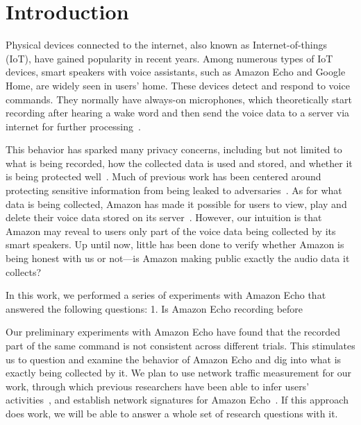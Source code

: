 \section{Introduction}
Physical devices connected to the internet, also known as Internet-of-things (IoT), have gained popularity in recent years. Among numerous types of IoT devices, smart speakers with voice assistants, such as Amazon Echo and Google Home, are widely seen in users' home. These devices detect and respond to voice commands. They normally have always-on microphones, which theoretically start recording after hearing a wake word and then send the voice data to a server via internet for further processing~\cite{AmazonEc68:online}.

This behavior has sparked many privacy concerns, including but not limited to what is being recorded, how the collected data is used and stored, and whether it is being protected well~\cite{lau2018alexa, fowler_2019, apthorpe2017smart, apthorpe2019keeping, apthorpe2017spying}. Much of previous work has been centered around protecting sensitive information from being leaked to adversaries~\cite{apthorpe2017smart, apthorpe2019keeping, apthorpe2017spying}. As for what data is being collected, Amazon has made it possible for users to view, play and delete their voice data stored on its server~\cite{ford2019alexa}. However, our intuition is that Amazon may reveal to users only part of the voice data being collected by its smart speakers. Up until now, little has been done to verify whether Amazon is being honest with us or not---is Amazon making public exactly the audio data it collects?

In this work, we performed a series of experiments with Amazon Echo that answered the following questions: 1. Is Amazon Echo recording before 

Our preliminary experiments with Amazon Echo have found that the recorded part of the same command is not consistent across different trials. This stimulates us to question and examine the behavior of Amazon Echo and dig into what is exactly being collected by it. We plan to use network traffic measurement for our work, through which previous researchers have been able to infer users' activities~\cite{apthorpe2017spying}, and establish network signatures for Amazon Echo~\cite{ford2019alexa}. If this approach does work, we will be able to answer a whole set of research questions with it.

